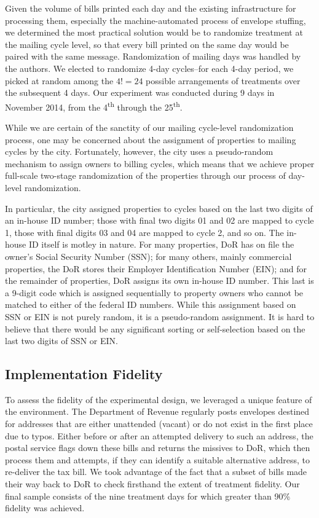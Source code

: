 \documentclass[12pt,titlepage]{article}
\begin{document}
Given the volume of bills printed each day and the existing
infrastructure for processing them, especially the machine-automated
process of envelope stuffing, we determined the most practical
solution would be to randomize treatment at the mailing cycle level,
so that every bill printed on the same day would be paired with the
same message. Randomization of mailing days was handled by the
authors. We elected to randomize 4-day cycles--for each 4-day period,
we picked at random among the $4!=24$ possible arrangements of
treatments over the subsequent 4 days. Our experiment was conducted
during 9 days in November 2014, from the 4\textsuperscript{th}
through the 25\textsuperscript{th}. 

While we are certain of the sanctity of our mailing cycle-level
randomization process, one may be concerned about the assignment of
properties to mailing cycles by the city. Fortunately, however, the city uses a
pseudo-random mechanism to assign owners to billing cycles, which means
that we achieve proper full-scale two-stage randomization of the
properties through our process of day-level randomization.

In particular, the city assigned properties to cycles based on the
last two digits of an in-house ID number; those with final two digits
01 and 02 are mapped to cycle 1, those with final digits 03 and 04 are
mapped to cycle 2, and so on. The in-house ID itself is motley in
nature. For many properties, DoR has on file the owner's Social
Security Number (SSN); for many others, mainly commercial properties,
the DoR stores their Employer Identification Number (EIN); and for the
remainder of properties, DoR assigns its own in-house ID number. This
last is a 9-digit code which is assigned sequentially to property
owners who cannot be matched to either of the federal ID
numbers. While this assignment based on SSN or EIN is not purely
random, it is a pseudo-random assignment. It is hard to believe
that there would be any significant sorting or self-selection based on
the last two digits of SSN or EIN.

\subsection{Implementation Fidelity}

To assess the fidelity of the experimental design, we leveraged a unique
feature of the environment. The Department of Revenue regularly posts envelopes destined
for addresses that are either unattended (vacant) or do not
exist in the first place due to typos. Either before or after an
attempted delivery to such an address, the postal service flags down
these bills and returns the missives to DoR, which then process them
and attempts, if they can identify a suitable alternative address, to
re-deliver the tax bill. We took advantage of the fact that a
subset of bills made their way back to DoR to check firsthand the extent of
treatment fidelity. Our final sample consists of the nine  treatment days
for which greater than 90\% fidelity was achieved.
\end{document}
